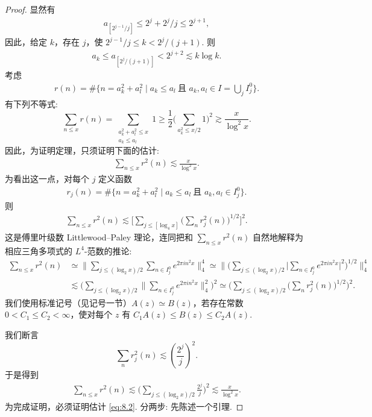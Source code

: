 \begin{proof}
显然有
\begin{align*}
  a_{[2^{j-1}/j]}\leq 2^{j}+2^{j}/j\leq 2^{j+1},
\end{align*}
因此，给定 $k$，存在 $j$，使 $2^{j-1}/j \leq k < 2^j/(j+1)$. 则
\begin{align*}
  a_{k}\leq a_{[2^{j}/(j+1)]}<2^{j+2}\lesssim k\log k.
\end{align*}
考虑
\begin{align*}
  r(n)=\#\{n=a_{k}^{2}+a_{l}^{2}\mid a_{k}\leq a_{l}\ \text{且 } a_{k},a_{l}\in I=\bigcup_{j}I_{j}^{0}\}.
\end{align*}
有下列不等式:
\begin{equation}\label{eq:8.1}
  \sum_{n\leq x}r(n)=\sum_{\substack{a_{k}^{2}+a_{l}^{2}\leq x\\ a_{k}\leq a_{l}}}1
  \geq\frac{1}{2}\Big(\sum_{a_{k}^{2}\leq x/2}1\Big)^{2}
  \gtrsim\frac{x}{\log^{2}x}.
\end{equation}
因此，为证明定理，只须证明下面的估计:
\begin{align*}
  \sum_{n\leq x}r^{2}(n)\lesssim\frac{x}{\log^{2}x}.
\end{align*}
为看出这一点，对每个 $j$ 定义函数
\begin{align*}
  r_{j}(n)=\#\{n=a_{k}^{2}+a_{l}^{2}\mid a_{k}\leq a_{l}\ \text{且 } a_{k},a_{l}\in I_{j}^{0}\}.
\end{align*}
则
\begin{align*}
  \sum_{n\leq x}r^{2}(n)\lesssim\Big[\sum_{j\leq[\log_{4}x]}\Big(\sum_{n}r_{j}^{2}(n)\Big)^{1/2}\Big]^{2}.
\end{align*}
这是傅里叶级数 Littlewood--Paley 理论，连同把和 $\sum_{n \leq x} r^2(n)$ 自然地解释为相应三角多项式的 $L^4$-范数的推论:
\begin{align*}
  \sum_{n\leq x}r^{2}(n)
  &\simeq\Big\|\sum_{j\leq(\log_{2}x)/2}\sum_{n\in I^{0}_{j}}e^{2\pi i n^{2}x}\Big\|_{4}^{4}
  \simeq\Big\|\Big(\sum_{j\leq(\log_{2}x)/2}\Big|\sum_{n\in I^{0}_{j}}e^{2\pi i n^{2}x}\Big|^{2}\Big)^{1/2}\Big\|_{4}^{4}\\
  &\lesssim\Big(\sum_{j\leq(\log_{2}x)/2}\Big\|\sum_{n\in I^{0}_{j}}e^{2\pi i n^{2}x}\Big\|_{4}^{2}\Big)^{2}
  \simeq\Big(\sum_{j\leq(\log_{2}x)/2}\Big(\sum_{n}r^{2}_{j}(n)\Big)^{1/2}\Big)^{2}.
\end{align*}
我们使用标准记号（见记号一节）$A(z) \simeq B(z)$，若存在常数 $0 < C_1 \leq C_2 < \infty$，使对每个 $z$ 有 $C_1A(z) \leq B(z) \leq C_2A(z)$.

我们断言
\begin{equation}\label{eq:8.2}
  \sum_{n}r_{j}^{2}(n)\lesssim\left(\frac{2^{j}}{j}\right)^{2}.
\end{equation}
于是得到
\begin{align*}
  \sum_{n\leq x}r^{2}(n)\lesssim\Big(\sum_{j\leq(\log_{2}x)/2}\frac{2^{j}}{j}\Big)^{2}
  \lesssim\frac{x}{\log^{2}x}.
\end{align*}
为完成证明，必须证明估计 \eqref{eq:8.2}. 分两步: 先陈述一个引理.


\end{proof}
